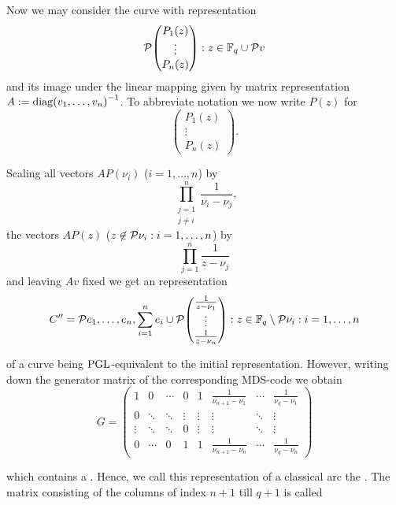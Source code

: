 Now we may consider the curve with representation
$$ \set{\begin{pmatrix} P_1(z)\\ \vdots\\ P_n(z)\end{pmatrix}:z\in\field{q}}\setjoin\set{v} $$
and its image under the linear mapping given by matrix representation $A:={\mathop\mathrm{diag}(v_1,\ldots,v_n)}^{-1}$.
To abbreviate notation we now write $P(z)$ for
$$ \begin{pmatrix} P_1(z)\\ \vdots\\ P_n(z)\end{pmatrix}\textrm{.} $$

Scaling all vectors $AP(\nu_i)$ ($i=1,\ldots,n$) by
$$ \prod_{\substack{j=1\\ j\neq i}}^n{\frac{1}{\nu_i-\nu_j}}\textrm{,} $$
the vectors $AP(z)$ ($z\not\in\set{\nu_i:i=1,\ldots,n}$) by 
$$ \prod_{j=1}^n{\frac{1}{z-\nu_j}} $$
and leaving $Av$ fixed we get an representation
$$ C'' = \set{e_1,\ldots,e_n,\sum_{i=1}^n{e_i}}\setjoin\set{\begin{pmatrix} \frac{1}{z-\nu_1} \\ \vdots\\ \frac{1}{z-\nu_n}\end{pmatrix}:z\in\field{q}\setminus\set{\nu_i:i=1,\ldots,n}} $$

of a curve being $\mathrm{PGL}$-equivalent to the initial representation.
However, writing down the generator matrix of the corresponding MDS-code we obtain
$$ G =
    \begin{pmatrix}
        1      & 0      & \cdots & 0      & 1      & \frac{1}{\nu_{n+1}-\nu_1} & \cdots & \frac{1}{\nu_q-\nu_1} \\
        0      & \ddots & \ddots & \vdots & \vdots & \vdots                & \ddots & \vdots            \\
        \vdots & \ddots & \ddots & 0      & \vdots & \vdots                & \ddots & \vdots            \\
        0      & \cdots & 0      & 1      & 1      & \frac{1}{\nu_{n+1}-\nu_n} & \cdots & \frac{1}{\nu_q-\nu_n}
    \end{pmatrix} $$

which contains a . Hence, we call this representation of a classical arc the . The matrix consisting of the columns of index $n+1$ till $q+1$ is called \label{cauchy-rep}
